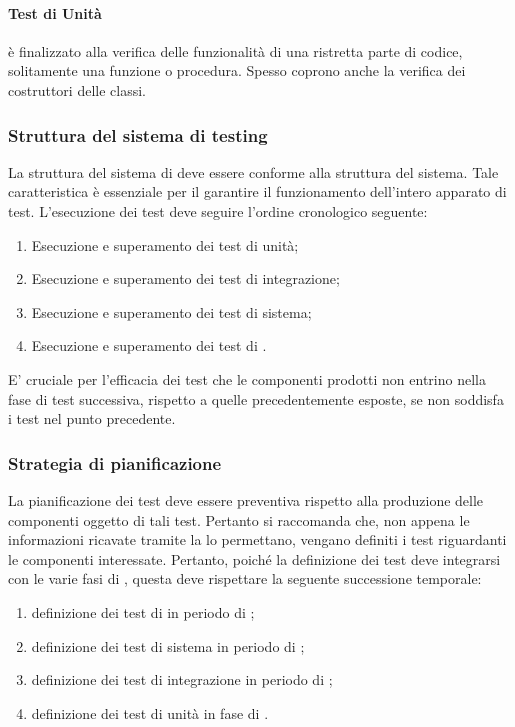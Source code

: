 \documentclass[12pt,a4paper]{article}
\begin{document}
\paragraph{Test di Unità} è finalizzato alla verifica delle funzionalità di una ristretta parte di codice, solitamente una funzione o procedura. Spesso coprono anche la verifica dei costruttori delle classi.

\subsubsection{Struttura del sistema di testing}
La struttura del sistema di  deve essere conforme alla struttura del sistema. Tale caratteristica è essenziale per il garantire il funzionamento dell'intero apparato di test. L'esecuzione dei test deve seguire l'ordine cronologico seguente:

\begin{enumerate}
	\item Esecuzione e superamento dei test di unità;
	\item Esecuzione e superamento dei test di integrazione;
	\item Esecuzione e superamento dei test di sistema;
	\item Esecuzione e superamento dei test di .
\end{enumerate}

E' cruciale per l'efficacia dei test che le componenti prodotti non entrino nella fase di test successiva, rispetto a quelle precedentemente esposte, se non soddisfa i test nel punto precedente.

\subsubsection{Strategia di pianificazione}
La pianificazione dei test deve essere preventiva rispetto alla produzione delle componenti oggetto di tali test. Pertanto si raccomanda che, non appena le informazioni ricavate tramite la  lo permettano, vengano definiti i test riguardanti le componenti interessate.
Pertanto, poiché la definizione dei test deve integrarsi con le varie fasi di , questa deve rispettare la seguente successione temporale:

\begin{enumerate}
\item definizione dei test di   in periodo di \FA;
\item definizione dei test di sistema in periodo di \FAD;
\item definizione dei test di integrazione in periodo di \FPA;
\item definizione dei test di unità in fase di \FPD.
\end{enumerate}
	
\end{document}
